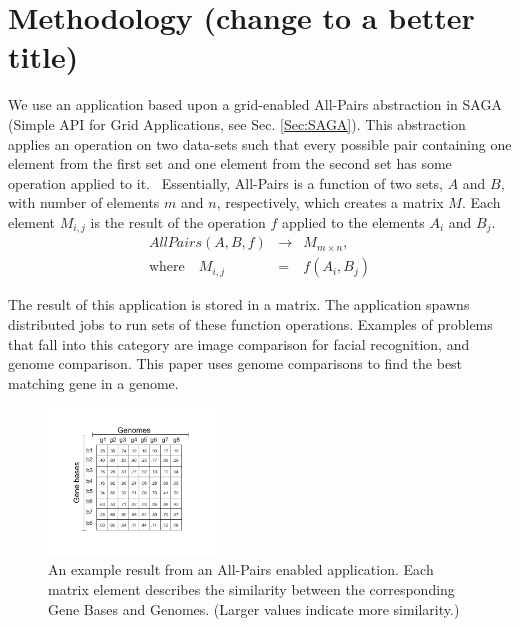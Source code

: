 \documentclass{rspublic}
\begin{document}


\section {Methodology (change to a better title)} We use an application
based upon a grid-enabled All-Pairs abstraction in SAGA (Simple API for
Grid Applications, see Sec. \ref{Sec:SAGA}). This abstraction applies an
operation on two data-sets such that every possible pair containing one
element from the first set and one element from the second set has some
operation applied to it.~\citep{saga_ccgrid09, AllPairs} Essentially,
All-Pairs is a function of two sets, $A$ and $B$, with number of
elements $m$ and $n$, respectively, which creates a matrix $M$. Each
element $M_{i,j}$ is the result of the operation $f$ applied to the
elements $A_i$ and $B_j$.
\begin{eqnarray}
 AllPairs(A, B, f) & \rightarrow & M_{m \times n}, \\
\mbox{where} \quad M_{i,j} & = & f(A_{i},B_{j})
 \end{eqnarray}
 
The result of this application is stored in a matrix. The application
spawns distributed jobs to run sets of these function operations.
Examples of problems that fall into this category are image comparison
for facial recognition, and genome comparison. This paper uses genome
comparisons to find the best matching gene in a genome.
\begin{figure}[!ht]
 \begin{center}
     \includegraphics[width=0.40\textwidth]{data/allpairs-exp.pdf}
\end{center}
\caption{\small An example result from an All-Pairs enabled
application.  Each matrix element describes the similarity between
 the corresponding Gene Bases and Genomes.  (Larger values indicate more similarity.)} \label{Fig:SAGA1}
\end{figure}
\end{document}
